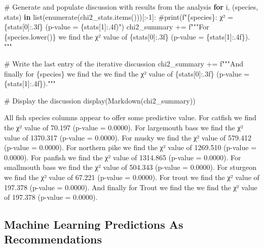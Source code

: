 \documentclass[
]{article}
\newenvironment{Shaded}{\begin{snugshade}}{\end{snugshade}}
\newcommand{\BuiltInTok}[1]{\textcolor[rgb]{0.00,0.23,0.31}{#1}}
\newcommand{\CommentTok}[1]{\textcolor[rgb]{0.37,0.37,0.37}{#1}}
\newcommand{\ControlFlowTok}[1]{\textcolor[rgb]{0.00,0.23,0.31}{\textbf{#1}}}
\newcommand{\DecValTok}[1]{\textcolor[rgb]{0.68,0.00,0.00}{#1}}
\newcommand{\KeywordTok}[1]{\textcolor[rgb]{0.00,0.23,0.31}{\textbf{#1}}}
\newcommand{\NormalTok}[1]{\textcolor[rgb]{0.00,0.23,0.31}{#1}}
\newcommand{\OperatorTok}[1]{\textcolor[rgb]{0.37,0.37,0.37}{#1}}
\newcommand{\SpecialCharTok}[1]{\textcolor[rgb]{0.37,0.37,0.37}{#1}}
\newcommand{\SpecialStringTok}[1]{\textcolor[rgb]{0.13,0.47,0.30}{#1}}
\begin{document}
\begin{Shaded}
\begin{Highlighting}[]
\CommentTok{\# Generate and populate discussion with results from the analysis}
\ControlFlowTok{for}\NormalTok{ i, (species, stats) }\KeywordTok{in} \BuiltInTok{list}\NormalTok{(}\BuiltInTok{enumerate}\NormalTok{(chi2\_stats.items()))[:}\OperatorTok{{-}}\DecValTok{1}\NormalTok{]:}
    \CommentTok{\#print(f"\{species\}: χ² = \{stats[0]:.3f\} (p{-}value = \{stats[1]:.4f)")}
\NormalTok{    chi2\_summary }\OperatorTok{+=} \SpecialStringTok{f"""For }\SpecialCharTok{\{}\NormalTok{species}\SpecialCharTok{.}\NormalTok{lower()}\SpecialCharTok{\}}\SpecialStringTok{ we find the χ² value of }
\SpecialStringTok{        }\SpecialCharTok{\{}\NormalTok{stats[}\DecValTok{0}\NormalTok{]}\SpecialCharTok{:.3f\}}\SpecialStringTok{ (p{-}value = }\SpecialCharTok{\{}\NormalTok{stats[}\DecValTok{1}\NormalTok{]}\SpecialCharTok{:.4f\}}\SpecialStringTok{). """}

\CommentTok{\# Write the last entry of the iterative discussion}
\NormalTok{chi2\_summary }\OperatorTok{+=} \SpecialStringTok{f"""And finally for }\SpecialCharTok{\{}\NormalTok{species}\SpecialCharTok{\}}\SpecialStringTok{ we }
\SpecialStringTok{        find the we find the χ² value of }
\SpecialStringTok{        }\SpecialCharTok{\{}\NormalTok{stats[}\DecValTok{0}\NormalTok{]}\SpecialCharTok{:.3f\}}\SpecialStringTok{ (p{-}value = }\SpecialCharTok{\{}\NormalTok{stats[}\DecValTok{1}\NormalTok{]}\SpecialCharTok{:.4f\}}\SpecialStringTok{)."""}

\CommentTok{\# Display the discussion}
\NormalTok{display(Markdown(chi2\_summary))}
\end{Highlighting}
\end{Shaded}

All fish species columns appear to offer some predictive value. For
catfish we find the χ² value of 70.197 (p-value = 0.0000). For
largemouth bass we find the χ² value of 1370.317 (p-value = 0.0000). For
musky we find the χ² value of 579.412 (p-value = 0.0000). For northern
pike we find the χ² value of 1269.510 (p-value = 0.0000). For panfish we
find the χ² value of 1314.865 (p-value = 0.0000). For smallmouth bass we
find the χ² value of 504.343 (p-value = 0.0000). For sturgeon we find
the χ² value of 67.221 (p-value = 0.0000). For trout we find the χ²
value of 197.378 (p-value = 0.0000). And finally for Trout we find the
we find the χ² value of 197.378 (p-value = 0.0000).

\subsection{Machine Learning Predictions As
Recommendations}\label{machine-learning-predictions-as-recommendations}
\end{document}
